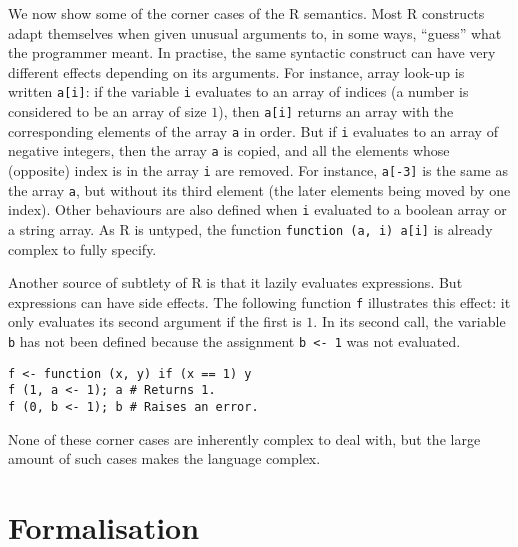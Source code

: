 \documentclass[9pt, sigplan, natbib=false, screen=true]{acmart}
\newcommand\R{R}
\begin{document}
We now show some of the corner cases of the \R{} semantics.
Most \R{} constructs adapt themselves when given unusual arguments
to, in some ways, ``guess'' what the programmer meant.
In practise, the same syntactic construct can have very different effects
depending on its arguments.
For instance, array look-up is written \texttt{a[i]}:
if the variable \texttt{i} evaluates to an array of indices
(a number is considered to be an array of size \(1\)),
then \texttt{a[i]} returns an array with
the corresponding elements of the array \texttt{a} in order.
But if \texttt{i} evaluates to an array of negative integers,
then the array \texttt{a} is copied,
and all the elements whose (opposite) index is in the array \texttt{i}
are removed.
For instance, \texttt{a[-3]} is the same as the array \texttt{a},
but without its third element
(the later elements being moved by one index).
Other behaviours are also defined when \texttt{i}
evaluated to a boolean array or a string array.
As \R{} is untyped,
the function \texttt{function (a, i) a[i]}
is already complex to fully specify.

Another source of subtlety of \R{} is that it lazily evaluates expressions.
But expressions can have side effects.
The following function \texttt{f} illustrates this effect:
it only evaluates its second argument if the first is \(1\).
In its second call, the variable \texttt{b}
has not been defined because the assignment \texttt{b <- 1}
was not evaluated.
\begin{verbatim}
f <- function (x, y) if (x == 1) y
f (1, a <- 1); a # Returns 1.
f (0, b <- 1); b # Raises an error.
\end{verbatim}

None of these corner cases are inherently complex to deal with,
but the large amount of such cases makes the language complex.


\section{Formalisation}
\label{sec:formalisation}
\end{document}

